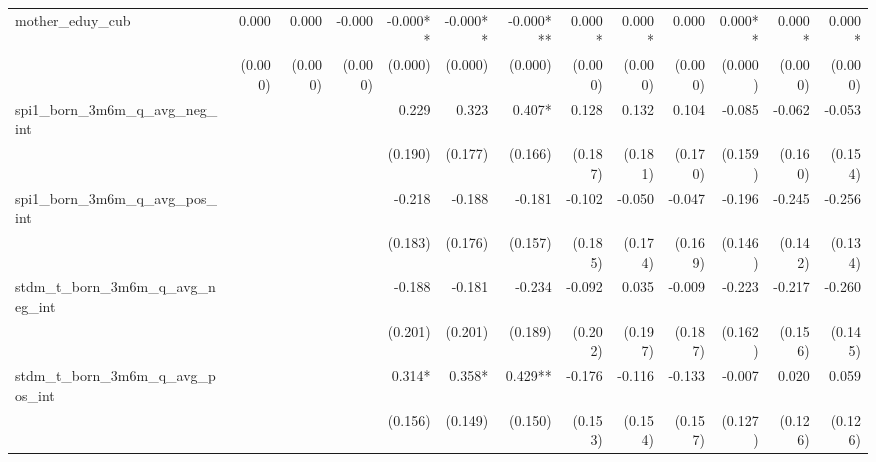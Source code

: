 \begin{tabular}{lrrrrrrrrrrrr}
mother\_eduy\_cub                           &        0.000 &        0.000 &       -0.000 &     -0.000** &     -0.000** &    -0.000*** &       0.000* &       0.000* &        0.000 &      0.000** &       0.000* &       0.000* \\ 
                                            &      (0.000) &      (0.000) &      (0.000) &      (0.000) &      (0.000) &      (0.000) &      (0.000) &      (0.000) &      (0.000) &      (0.000) &      (0.000) &      (0.000) \\ 
spi1\_born\_3m6m\_q\_avg\_neg\_int          &              &              &              &        0.229 &        0.323 &       0.407* &        0.128 &        0.132 &        0.104 &       -0.085 &       -0.062 &       -0.053 \\ 
                                            &              &              &              &      (0.190) &      (0.177) &      (0.166) &      (0.187) &      (0.181) &      (0.170) &      (0.159) &      (0.160) &      (0.154) \\ 
spi1\_born\_3m6m\_q\_avg\_pos\_int          &              &              &              &       -0.218 &       -0.188 &       -0.181 &       -0.102 &       -0.050 &       -0.047 &       -0.196 &       -0.245 &       -0.256 \\ 
                                            &              &              &              &      (0.183) &      (0.176) &      (0.157) &      (0.185) &      (0.174) &      (0.169) &      (0.146) &      (0.142) &      (0.134) \\ 
stdm\_t\_born\_3m6m\_q\_avg\_neg\_int       &              &              &              &       -0.188 &       -0.181 &       -0.234 &       -0.092 &        0.035 &       -0.009 &       -0.223 &       -0.217 &       -0.260 \\ 
                                            &              &              &              &      (0.201) &      (0.201) &      (0.189) &      (0.202) &      (0.197) &      (0.187) &      (0.162) &      (0.156) &      (0.145) \\ 
stdm\_t\_born\_3m6m\_q\_avg\_pos\_int       &              &              &              &       0.314* &       0.358* &      0.429** &       -0.176 &       -0.116 &       -0.133 &       -0.007 &        0.020 &        0.059 \\ 
                                            &              &              &              &      (0.156) &      (0.149) &      (0.150) &      (0.153) &      (0.154) &      (0.157) &      (0.127) &      (0.126) &      (0.126) \\ 

\end{tabular}
